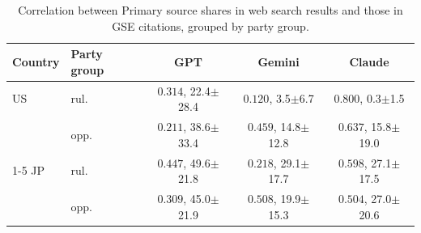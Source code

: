 \begin{table}[t]
\centering
\footnotesize
\setlength{\tabcolsep}{1.8pt}
\caption{Correlation between Primary source shares in web search results and those in GSE citations, grouped by party group.}
\label{tab:brave-citation-barrier-correlation-party-group}
\begin{tabular}{llccc}
\toprule
\textbf{Country} & \textbf{Party group} & \textbf{GPT} & \textbf{Gemini} & \textbf{Claude} \\
\midrule
US & rul. & \textcolor{red!50!black}{$0.314$}, 22.4$\pm$28.4 & \textcolor{red!30!black}{$0.120$}, 3.5$\pm$6.7 & \textcolor{red!90!black}{$0.800$}, 0.3$\pm$1.5 \\
 & opp. & \textcolor{red!30!black}{$0.211$}, 38.6$\pm$33.4 & \textcolor{red!50!black}{$0.459$}, 14.8$\pm$12.8 & \textcolor{red!70!black}{$0.637$}, 15.8$\pm$19.0 \\
\cmidrule(lr){1-5}
JP & rul. & \textcolor{red!50!black}{$0.447$}, 49.6$\pm$21.8 & \textcolor{red!30!black}{$0.218$}, 29.1$\pm$17.7 & \textcolor{red!70!black}{$0.598$}, 27.1$\pm$17.5 \\
 & opp. & \textcolor{red!50!black}{$0.309$}, 45.0$\pm$21.9 & \textcolor{red!70!black}{$0.508$}, 19.9$\pm$15.3 & \textcolor{red!70!black}{$0.504$}, 27.0$\pm$20.6 \\
\bottomrule
\end{tabular}
\end{table}
